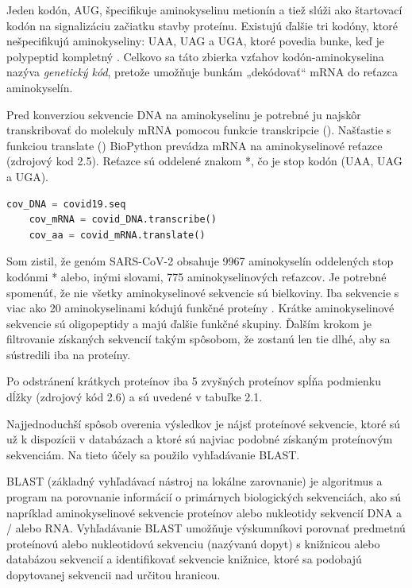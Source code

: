 Jeden kodón, AUG, špecifikuje aminokyselinu metionín a tiež slúži ako štartovací kodón na signalizáciu začiatku stavby proteínu.
Existujú ďalšie tri kodóny, ktoré nešpecifikujú aminokyseliny: UAA, UAG a UGA, ktoré povedia bunke, keď je polypeptid kompletný \cite{aminouag}.
Celkovo sa táto zbierka vzťahov kodón-aminokyselina nazýva \textit{genetický kód}, pretože umožňuje bunkám „dekódovať“ mRNA do reťazca aminokyselín.

Pred konverziou sekvencie DNA na aminokyselinu je potrebné ju najskôr transkribovať do molekuly mRNA \cite{rnaseqexp} pomocou funkcie transkripcie ().
Našťastie s funkciou translate () BioPython prevádza mRNA na aminokyselinové reťazce (zdrojový kod 2.5).
Reťazce sú oddelené znakom *, čo je stop kodón (UAA, UAG a UGA).

\begin{lstlisting}[language=Python, caption=Prepis a preklad pomocou BioPythonu]
    cov_DNA = covid19.seq
    cov_mRNA = covid_DNA.transcribe()
    cov_aa = covid_mRNA.translate()
\end{lstlisting}

Som zistil, že genóm SARS-CoV-2 obsahuje 9967 aminokyselín oddelených stop kodónmi * alebo, inými slovami, 775 aminokyselinových reťazcov.
Je potrebné spomenúť, že nie všetky aminokyselinové sekvencie sú bielkoviny.
Iba sekvencie s viac ako 20 aminokyselinami kódujú funkčné proteíny \cite{cov1}.
Krátke aminokyselinové sekvencie sú oligopeptidy a majú ďalšie funkčné skupiny.
Ďalším krokom je filtrovanie získaných sekvencií takým spôsobom, že zostanú len tie dlhé, aby sa sústredili iba na proteíny.

Po odstránení krátkych proteínov iba 5 zvyšných proteínov spĺňa podmienku dĺžky (zdrojový kód 2.6) a sú uvedené v tabuľke 2.1.

Najjednoduchší spôsob overenia výsledkov je nájsť proteínové sekvencie, ktoré sú už k dispozícii v databázach a ktoré sú najviac podobné získaným proteínovým sekvenciám.
Na tieto účely sa použilo vyhľadávanie BLAST.

BLAST (základný vyhľadávací nástroj na lokálne zarovnanie) je algoritmus a program na porovnanie informácií o primárnych biologických sekvenciách, ako sú napríklad aminokyselinové sekvencie proteínov alebo nukleotidy sekvencií DNA a / alebo RNA.
Vyhľadávanie BLAST umožňuje výskumníkovi porovnať predmetnú proteínovú alebo nukleotidovú sekvenciu (nazývanú dopyt) s knižnicou alebo databázou sekvencií a identifikovať sekvencie knižnice, ktoré sa podobajú dopytovanej sekvencii nad určitou hranicou.

